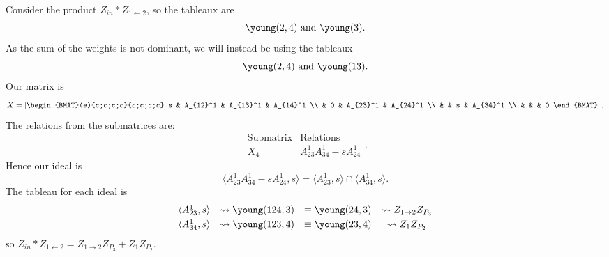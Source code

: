 \documentclass{article} %
\begin{document}
\begin{example}
Consider the product $Z_{in} * Z_{1 \leftarrow 2}$, so the tableaux are
\[
\young(2,4) \text{ and } \young(3).
\]
As the sum of the weights is not dominant, we will instead be using the tableaux
\[
\young(2,4) \text{ and } \young(13).
\]
Our matrix is 
\[
X = \left[\begin{BMAT}(e){c;c;c;c}{c;c;c;c}
     s & A_{12}^1 & A_{13}^1 & A_{14}^1 \\
     & 0 & A_{23}^1 & A_{24}^1 \\
     & & s & A_{34}^1 \\
     & & & 0
\end{BMAT}
\right].
\]
The relations from the submatrices are:
\[
\begin{array}{c|c}
    \text{Submatrix} & \text{Relations} \\ \hline
    X_4 & A_{23}^1A_{34}^1 - sA_{24}^1
\end{array}.
\]
Hence our ideal is 
\[
\langle A_{23}^1A_{34}^1 - sA_{24}^1,s \rangle
= \langle A_{23}^1,s \rangle \cap \langle A_{34}^1,s \rangle.
\]
The tableau for each ideal is
\[\begin{array}{cccc}\vspace{1mm}
    \langle A_{23}^1,s \rangle &\leadsto \young(124,3) &\equiv \young(24,3) &\leadsto Z_{1 \rightarrow 2} Z_{P_3} \\ 
    \langle A_{34}^1,s \rangle &\leadsto \young(123,4) &\equiv \young(23,4) &\leadsto Z_1 Z_{P_2}
\end{array}
\]
so $Z_{in} * Z_{1 \leftarrow 2} = Z_{1 \rightarrow 2} Z_{P_3} + Z_1 Z_{P_2}$.
\end{example}
\end{document}
